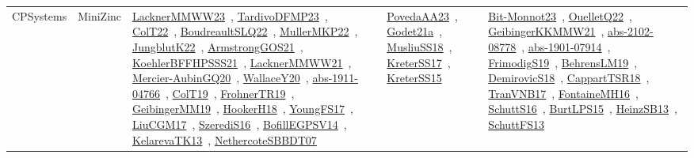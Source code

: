 {\begin{longtable}{lp{3cm}>{\raggedright\arraybackslash}p{6cm}>{\raggedright\arraybackslash}p{6cm}>{\raggedright\arraybackslash}p{8cm}}
CPSystems & MiniZinc & \href{works/LacknerMMWW23.pdf}{LacknerMMWW23}~\cite{LacknerMMWW23}, \href{works/TardivoDFMP23.pdf}{TardivoDFMP23}~\cite{TardivoDFMP23}, \href{works/ColT22.pdf}{ColT22}~\cite{ColT22}, \href{works/BoudreaultSLQ22.pdf}{BoudreaultSLQ22}~\cite{BoudreaultSLQ22}, \href{works/MullerMKP22.pdf}{MullerMKP22}~\cite{MullerMKP22}, \href{works/JungblutK22.pdf}{JungblutK22}~\cite{JungblutK22}, \href{works/ArmstrongGOS21.pdf}{ArmstrongGOS21}~\cite{ArmstrongGOS21}, \href{works/KoehlerBFFHPSSS21.pdf}{KoehlerBFFHPSSS21}~\cite{KoehlerBFFHPSSS21}, \href{works/LacknerMMWW21.pdf}{LacknerMMWW21}~\cite{LacknerMMWW21}, \href{works/Mercier-AubinGQ20.pdf}{Mercier-AubinGQ20}~\cite{Mercier-AubinGQ20}, \href{works/WallaceY20.pdf}{WallaceY20}~\cite{WallaceY20}, \href{works/abs-1911-04766.pdf}{abs-1911-04766}~\cite{abs-1911-04766}, \href{works/ColT19.pdf}{ColT19}~\cite{ColT19}, \href{works/FrohnerTR19.pdf}{FrohnerTR19}~\cite{FrohnerTR19}, \href{works/GeibingerMM19.pdf}{GeibingerMM19}~\cite{GeibingerMM19}, \href{works/HookerH18.pdf}{HookerH18}~\cite{HookerH18}, \href{works/YoungFS17.pdf}{YoungFS17}~\cite{YoungFS17}, \href{works/LiuCGM17.pdf}{LiuCGM17}~\cite{LiuCGM17}, \href{works/SzerediS16.pdf}{SzerediS16}~\cite{SzerediS16}, \href{works/BofillEGPSV14.pdf}{BofillEGPSV14}~\cite{BofillEGPSV14}, \href{works/KelarevaTK13.pdf}{KelarevaTK13}~\cite{KelarevaTK13}, \href{works/NethercoteSBBDT07.pdf}{NethercoteSBBDT07}~\cite{NethercoteSBBDT07} & \href{works/PovedaAA23.pdf}{PovedaAA23}~\cite{PovedaAA23}, \href{works/Godet21a.pdf}{Godet21a}~\cite{Godet21a}, \href{works/MusliuSS18.pdf}{MusliuSS18}~\cite{MusliuSS18}, \href{works/KreterSS17.pdf}{KreterSS17}~\cite{KreterSS17}, \href{works/KreterSS15.pdf}{KreterSS15}~\cite{KreterSS15} & \href{works/Bit-Monnot23.pdf}{Bit-Monnot23}~\cite{Bit-Monnot23}, \href{works/OuelletQ22.pdf}{OuelletQ22}~\cite{OuelletQ22}, \href{works/GeibingerKKMMW21.pdf}{GeibingerKKMMW21}~\cite{GeibingerKKMMW21}, \href{works/abs-2102-08778.pdf}{abs-2102-08778}~\cite{abs-2102-08778}, \href{works/abs-1901-07914.pdf}{abs-1901-07914}~\cite{abs-1901-07914}, \href{works/FrimodigS19.pdf}{FrimodigS19}~\cite{FrimodigS19}, \href{works/BehrensLM19.pdf}{BehrensLM19}~\cite{BehrensLM19}, \href{works/DemirovicS18.pdf}{DemirovicS18}~\cite{DemirovicS18}, \href{works/CappartTSR18.pdf}{CappartTSR18}~\cite{CappartTSR18}, \href{works/TranVNB17.pdf}{TranVNB17}~\cite{TranVNB17}, \href{works/FontaineMH16.pdf}{FontaineMH16}~\cite{FontaineMH16}, \href{works/SchuttS16.pdf}{SchuttS16}~\cite{SchuttS16}, \href{works/BurtLPS15.pdf}{BurtLPS15}~\cite{BurtLPS15}, \href{works/HeinzSB13.pdf}{HeinzSB13}~\cite{HeinzSB13}, \href{works/SchuttFS13.pdf}{SchuttFS13}~\cite{SchuttFS13}\\

\end{longtable}}
